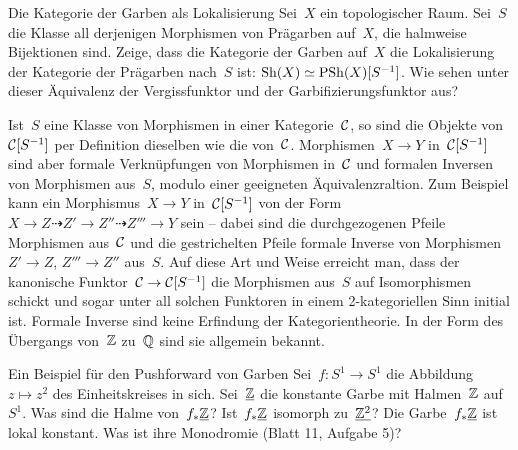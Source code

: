\documentclass{uebblatt}
\begin{document}
\begin{aufgabe}{Die Kategorie der Garben als Lokalisierung}
Sei~$X$ ein topologischer Raum. Sei~$S$ die Klasse all
derjenigen Morphismen von Prägarben auf~$X$, die halmweise Bijektionen sind.
Zeige, dass die Kategorie der Garben auf~$X$ die Lokalisierung der Kategorie
der Prägarben nach~$S$ ist: $\mathrm{Sh}(X) \simeq \mathrm{PSh}(X)[S^{-1}]$. Wie sehen unter
dieser Äquivalenz der Vergissfunktor und der Garbifizierungsfunktor aus?

{\scriptsize Ist~$S$ eine Klasse von Morphismen in einer Kategorie~$\mathcal{C}$, so
sind die Objekte von~$\mathcal{C}[S^{-1}]$ per Definition dieselben wie die von~$\mathcal{C}$.
Morphismen~$X \to Y$ in~$\mathcal{C}[S^{-1}]$ sind aber formale Verknüpfungen von
Morphismen in~$\mathcal{C}$ und formalen Inversen von Morphismen aus~$S$, modulo einer
geeigneten Äquivalenzraltion. Zum Beispiel
kann ein Morphismus~$X \to Y$ in~$\mathcal{C}[S^{-1}]$ von der Form~$X \to Z
\dashrightarrow Z' \to Z'' \dashrightarrow Z''' \to Y$ sein -- dabei sind die
durchgezogenen Pfeile Morphismen aus~$\mathcal{C}$ und die gestrichelten Pfeile
formale Inverse von Morphismen~$Z' \to Z$, $Z''' \to Z''$ aus~$S$. Auf
diese Art und Weise erreicht man, dass der kanonische Funktor~$\mathcal{C} \to
\mathcal{C}[S^{-1}]$ die Morphismen aus~$S$ auf Isomorphismen schickt und sogar unter
all solchen Funktoren in einem 2-kategoriellen Sinn initial ist. Formale
Inverse sind keine Erfindung der Kategorientheorie. In der Form des Übergangs
von~$\mathbb{Z}$ zu~$\mathbb{Q}$ sind sie allgemein bekannt.
\par}
\end{aufgabe}

\begin{aufgabe}{Ein Beispiel für den Pushforward von Garben}
Sei~$f : S^1 \to S^1$ die Abbildung~$z \mapsto z^2$ des Einheitskreises in
sich. Sei~$\underline{\mathbb{Z}}$ die konstante Garbe mit Halmen~$\mathbb{Z}$ auf~$S^1$. Was sind
die Halme von~$f_*\underline{\mathbb{Z}}$? Ist~$f_*\underline{\mathbb{Z}}$ isomorph zu~$\underline{\mathbb{Z}^2}$?
Die Garbe~$f_*\underline{\mathbb{Z}}$ ist lokal konstant. Was ist ihre Monodromie (Blatt 11, Aufgabe 5)?
\end{aufgabe}
\end{document}
